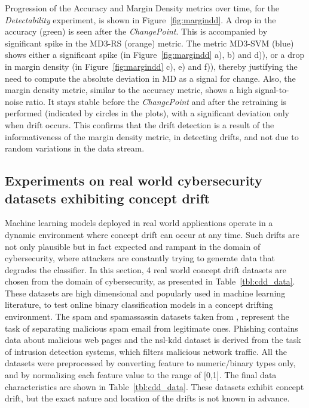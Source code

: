 \documentclass[authoryear,3p,times,twocolumn]{elsarticle}
\begin{document}
Progression of the Accuracy and Margin Density metrics over time, for the \textit{Detectability} experiment, is shown in Figure~\ref{fig:margindd}. A drop in the accuracy (green) is seen after the \textit{ChangePoint}. This is accompanied by significant spike in the MD3-RS (orange) metric. The metric MD3-SVM (blue) shows either a significant spike (in Figure~\ref{fig:margindd} a), b) and d)), or a drop in margin density (in Figure~\ref{fig:margindd} c), e) and f)), thereby justifying the need to compute the absolute deviation in MD as a signal for change. Also, the margin density metric, similar to the accuracy metric,  shows a high signal-to-noise ratio. It stays stable before the \textit{ChangePoint} and after the retraining is performed (indicated by circles in the plots), with a significant deviation only when drift occurs. This confirms that the drift detection is a result of the informativeness of the margin density metric, in detecting drifts, and not due to random variations in the data stream. 


\subsection{Experiments on real world cybersecurity datasets exhibiting concept drift}
\label{sec:cdd}
Machine learning models deployed in real world applications operate in a dynamic environment where concept drift can occur at any time. Such drifts are not only plausible but in fact expected and rampant in the domain of cybersecurity, where attackers are constantly trying to generate data that degrades the classifier. In this section, 4 real world concept drift datasets are chosen from the domain of cybersecurity, as presented in Table~\ref{tbl:cdd_data}. These datasets are high dimensional and popularly used in machine learning literature, to test online binary classification models in a concept drifting environment. The spam and spamassassin datasets taken from \citep{katakis2010tracking, katakis2009adaptive}, represent the task of separating malicious spam email from legitimate ones. Phishing \citep{Lichman:2013} contains data about malicious web pages and the nsl-kdd dataset \citep{tavallaee2009detailed} is derived from the task of intrusion detection systems, which filters malicious network traffic. All the datasets were preprocessed by converting feature to numeric/binary types only, and by normalizing each feature value to the range of [0,1]. The final data characteristics are shown in Table~\ref{tbl:cdd_data}. These datasets exhibit concept drift, but the exact nature and location of the drifts is not known in advance. 
\end{document}
